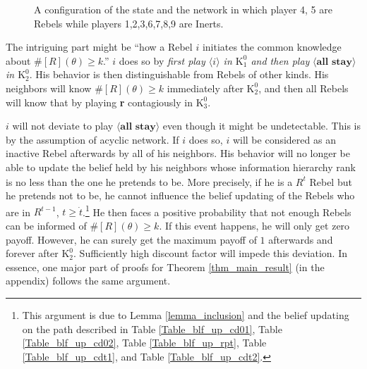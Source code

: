 \documentclass[12pt,letter]{article}
\newcommand{\Kappa}{\mathrm{K}}
\theoremstyle{definition}
\theoremstyle{remark}
\theoremstyle{claim}
\begin{document}
\begin{figure}

\label{fig:central_less_k}
\begin{center}
\end{center}
\caption{A configuration of the state and the network in which player 4, 5 are Rebels while players 1,2,3,6,7,8,9 are Inerts.}
\end{figure}

The intriguing part might be ``how a Rebel $i$ initiates the common knowledge about $\#[R](\theta)\geq k$.'' $i$ does so by \textit{first play $\langle i \rangle$ in $\Kappa^0_{1}$ and then play} $\langle \textbf{all stay} \rangle$ \textit{in $\Kappa^0_{2}$}. His behavior is then distinguishable from Rebels of other kinds. His neighbors will know $\#[R](\theta)\geq k$ immediately after $\Kappa^0_{2}$, and then all Rebels will know that by playing \textbf{r} contagiously in $\Kappa^0_{3}$. 

$i$ will not deviate to play $\langle \textbf{all stay} \rangle$ even though it might be undetectable. This is by the assumption of acyclic network. If $i$ does so, $i$ will be considered as an inactive Rebel afterwards by all of his neighbors. His behavior will no longer be able to update the belief held by his neighbors whose information hierarchy rank is no less than the one he pretends to be. More precisely, if he is a $R^{\dot{t}}$ Rebel but he pretends not to be, he cannot influence the belief updating of the Rebels who are in $R^{t-1}$, $t\geq \dot{t}$.\footnote{This argument is due to Lemma \ref{lemma_inclusion} and the belief updating on the path described in Table \ref{Table_blf_up_cd01}, Table \ref{Table_blf_up_cd02}, Table \ref{Table_blf_up_rpt}, Table \ref{Table_blf_up_cdt1}, and Table \ref{Table_blf_up_cdt2}.} 
He then faces a positive probability that not enough Rebels can be informed of $\#[R](\theta)\geq k$. If this event happens, he will only get zero payoff. However, he can surely get the maximum payoff of $1$ afterwards and forever after $\Kappa^0_2$. Sufficiently high discount factor will impede this deviation. In essence, one major part of proofs for Theorem \ref{thm_main_result} (in the appendix) follows the same argument.
\end{document}
